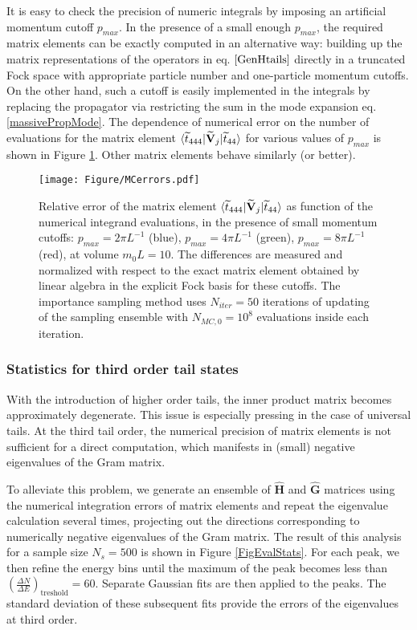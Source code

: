 \documentclass[twocolumn,secnumarabic,amssymb, nobibnotes, aps, prd]{revtex4-2}
\begin{document}
It is easy to check the precision of numeric integrals by imposing an artificial momentum cutoff $p_{max}$. In the presence of a small enough $p_{max}$, the required matrix elements can be exactly computed in an alternative way: building up the matrix representations of the operators in eq. $\eqref{GenHtails}$ directly in a truncated Fock space with appropriate particle number and one-particle momentum cutoffs. On the other hand, such a cutoff is easily implemented in the integrals by replacing the propagator via restricting the sum in the mode expansion eq. \eqref{massivePropMode}. The dependence of numerical error on the number of evaluations for the matrix element $\braket{\widetilde t_{444}|\widetilde{\mathbf V}_j|\widetilde t_{44}}$ for various values of $p_{max}$ is shown in Figure \ref{FigH5interr}.  Other matrix elements behave similarly (or better).
\begin{figure}[h]
    \centering
 \texttt{[image: Figure/MCerrors.pdf]}%
    \caption{
    Relative error of the matrix element $\braket{\widetilde t_{444}|\widetilde{\mathbf V}_j|\widetilde t_{44}}$ as function of the numerical integrand evaluations, in the presence of small momentum cutoffs:  $p_{max}=2\pi L^{-1}$ (blue), $p_{max}=4\pi L^{-1}$ (green), $p_{max}=8\pi L^{-1}$ (red), at volume $m_0L=10$. The differences are measured and normalized with respect to the exact matrix element obtained by linear algebra in the explicit Fock basis for these cutoffs. The importance sampling method uses $N_{iter}=50$ iterations of updating of the sampling ensemble with $N_{MC,0}=10^8$ evaluations inside each iteration. }
    \label{FigH5interr}
\end{figure}

\subsubsection{Statistics for third order tail states} \label{StatSubsec}
With the introduction of higher order tails, the inner product matrix becomes approximately degenerate. This issue is especially pressing in the case of universal tails. At the third tail order, the numerical precision of matrix elements is not sufficient for a direct computation, which manifests in (small) negative eigenvalues of the Gram matrix.

To alleviate this problem, we generate an ensemble of $\hat{\mathbf{H}}$ and $\hat{\mathbf{G}}$ matrices using the numerical integration errors of matrix elements and repeat the eigenvalue calculation several times, projecting out the directions corresponding to numerically negative eigenvalues of the Gram matrix. The result of this analysis for a sample size $N_s=500$ is shown in Figure \ref{FigEvalStats}. For each peak, we then refine the energy bins until the maximum of the peak becomes less than $\left(\frac{\Delta N}{\Delta E}\right)_{\mathrm{treshold}}=60$. Separate Gaussian fits are then applied to the peaks. The standard deviation of these subsequent fits provide the errors of the eigenvalues at third order.
\end{document}
